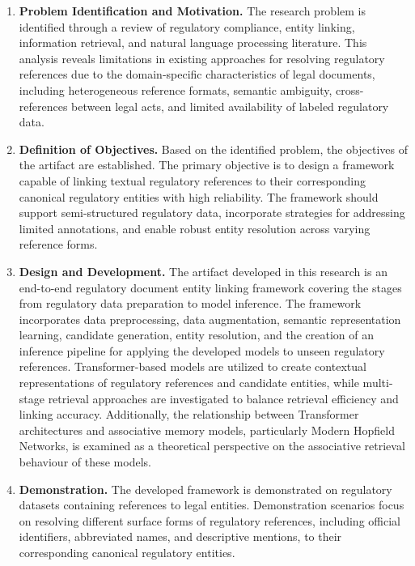 \begin{enumerate}

    \item \textbf{Problem Identification and Motivation.}
    The research problem is identified through a review of regulatory
    compliance, entity linking, information retrieval, and natural language
    processing literature. This analysis reveals limitations in existing
    approaches for resolving regulatory references due to the domain-specific
    characteristics of legal documents, including heterogeneous reference
    formats, semantic ambiguity, cross-references between legal acts, and
    limited availability of labeled regulatory data.

    \item \textbf{Definition of Objectives.}
    Based on the identified problem, the objectives of the artifact are
    established. The primary objective is to design a framework capable of
    linking textual regulatory references to their corresponding canonical
    regulatory entities with high reliability. The framework should support
    semi-structured regulatory data, incorporate strategies for addressing
    limited annotations, and enable robust entity resolution across varying
    reference forms.

    \item \textbf{Design and Development.}
    The artifact developed in this research is an end-to-end regulatory document entity
    linking framework covering the stages from regulatory data preparation to
    model inference. The framework incorporates data preprocessing, data
    augmentation, semantic representation learning, candidate generation, entity
    resolution, and the creation of an inference pipeline for applying the
    developed models to unseen regulatory references. Transformer-based models
    are utilized to create contextual representations of regulatory references
    and candidate entities, while multi-stage retrieval approaches are
    investigated to balance retrieval efficiency and linking accuracy.
    Additionally, the relationship between Transformer architectures and
    associative memory models, particularly Modern Hopfield Networks, is examined
    as a theoretical perspective on the associative retrieval behaviour of these
    models.

    \item \textbf{Demonstration.}
    The developed framework is demonstrated on regulatory datasets containing
    references to legal entities. Demonstration scenarios focus on resolving
    different surface forms of regulatory references, including official
    identifiers, abbreviated names, and descriptive mentions, to their
    corresponding canonical regulatory entities.


\end{enumerate}
